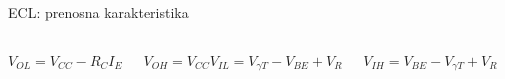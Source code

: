 \begin{frame}[label=10-s086]{ECL: prenosna karakteristika}
\setlength{\abovedisplayskip}{4pt}\setlength{\belowdisplayskip}{4pt}\setlength{\abovedisplayshortskip}{3pt}\setlength{\belowdisplayshortskip}{3pt}
\begin{columns}[T,onlytextwidth]\centering \end{columns}\smallskip
\begin{columns}[T,onlytextwidth]$V_{OL}=V_{CC}-R_CI_E$\par $V_{OH}=V_{CC}$$V_{IL}=V_{\gamma T}-V_{BE}+V_R$\par $V_{IH}=V_{BE}-V_{\gamma T}+V_R$\end{columns}\smallskip
{}
\end{frame}
